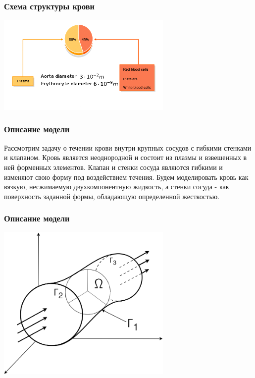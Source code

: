 \documentclass[14pt]{beamer}
\begin{document}
\begin{frame}
\frametitle{Схема структуры крови}
    \begin{center}
        \includegraphics[width=8.5cm]{blood_scheme3.png}
    \end{center}
\end{frame}


\begin{frame}
\frametitle{Описание модели}
Рассмотрим задачу о течении крови внутри крупных сосудов с гибкими стенками и клапаном. Кровь является неоднородной и состоит из плазмы и взвешенных в ней форменных элементов. Клапан и стенки сосуда являются гибкими и изменяют свою форму под воздействием течения. Будем моделировать кровь как вязкую, несжимаемую двухкомпонентную жидкость, а стенки сосуда - как поверхность заданной формы, обладающую определенной жесткостью.
\end{frame}

\begin{frame}
\frametitle{Описание модели}
    \begin{center}
        \includegraphics[width=8.5cm]{area_3d.png}
    \end{center}
\end{frame}
\end{document}
